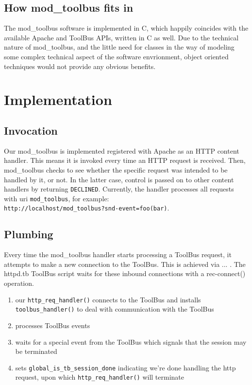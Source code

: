 \documentclass[a4paper,10pt]{article}
\begin{document}
\subsection{How mod\_toolbus fits in}
The mod\_toolbus software is implemented in C, which happily coincides with the available Apache and ToolBus APIs, written in C as well. Due to the technical nature of mod\_toolbus, and the little need for classes in the way of modeling some complex technical aspect of the software envrionment, object oriented techniques would not provide any obvious benefits.


\section{Implementation}

\subsection{Invocation}
Our mod\_toolbus is implemented registered with Apache as an HTTP content handler. This means it is invoked every time an HTTP request is received. Then, mod\_toolbus checks to see whether the specific request was intended to be handled by it, or not. In the latter case, control is passed on to other content handlers by returning \texttt{DECLINED}. Currently, the handler processes all requests with uri \texttt{mod\_toolbus}, for example:\\
\texttt{http://localhost/mod\_toolbus?snd-event=foo(bar)}.

\subsection{Plumbing}
Every time the mod\_toolbus handler starts processing a ToolBus request, it attempts to make a new connection to the ToolBus. This is achieved via ... . The httpd.tb ToolBus script waits for these inbound connections with a rec-connect() operation.

\begin{enumerate}
\item our \texttt{http\_req\_handler()} connects to the ToolBus and installs \texttt{toolbus\_handler()} to deal with communication with the ToolBus
\item processes ToolBus events
\item waits for a special event from the ToolBus which signals that the session may be terminated
\item sets \texttt{global\_is\_tb\_session\_done} indicating we're done handling the http request, upon which \texttt{http\_req\_handler()} will terminate
\end{enumerate} 
\end{document}
